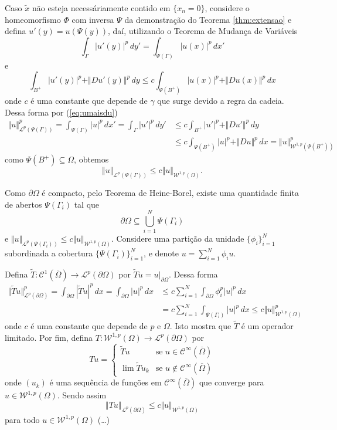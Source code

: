 \documentclass[a4paper, 11pt]{book}
\theoremstyle{definition}
\newcommand{\cC}{\mathcal{C}}
\newcommand{\cL}{\mathcal{L}}
\newcommand{\cW}{\mathcal{W}}
\begin{document}
\begin{prf}
    Caso $\tilde x$ não esteja necessáriamente contido em $\{x_n =0 \}$, considere o homeomorfismo $\Phi$ com inversa $\Psi$ da demonstração do Teorema \ref{thm:extensao} e defina $u'(y) = u(\Psi(y))$, daí, utilizando o Teorema de Mudança de Variáveis
    \[
        \int_\Gamma |u'(y)|^p \,dy' = \int_{\Psi(\Gamma)} |u(x)|^p \,dx'
    \]
    e
    \[
        \int_{B^+} |u'(y)|^p + \Vert Du'(y) \Vert^p \,dy \leqslant c\int_{\Psi(B^+)} |u(x)|^p + \Vert Du(x) \Vert^p \,dx
    \]
    onde $c$ é uma constante que depende de $\gamma$ que surge devido a regra da cadeia. Dessa forma por (\ref{eq:umaisdu})
    \[
        \begin{aligned}
            \Vert u \Vert^p_{\cL^p(\Psi(\Gamma))} = \int_{\Psi(\Gamma)} |u|^p \,dx' = \int_{\Gamma} |u'|^p \,dy' &\leqslant c\int_{B^+} |u'|^p + \Vert Du' \Vert^p \,dy\\ 
            &\leqslant c \int_{\Psi(B^+)} |u|^p + \Vert Du \Vert^p \,dx = \Vert u \Vert_{\cW^{1,p}(\Psi(B^+))}^p
        \end{aligned}
    \]
    como $\Psi(B^+) \subseteq \Omega$, obtemos 
    \[
        \Vert u \Vert_{\cL^p(\Psi(\Gamma))} \leqslant c \Vert u \Vert_{\cW^{1,p}(\Omega)}.
    \]

    Como $\partial\Omega$ é compacto, pelo Teorema de Heine-Borel, existe uma quantidade finita de abertos $\Psi(\Gamma_i)$ tal que
    \[
        \partial\Omega \subseteq \bigcup_{i=1}^N \Psi(\Gamma_i)
    \]
    e $\Vert u \Vert_{\cL^p(\Psi(\Gamma_i))} \leqslant c \Vert u \Vert_{\cW^{1,p}(\Omega)}$.
    Considere uma partição da unidade $\{\phi_i\}_{i=1}^N$ subordinada a cobertura $\{\Psi(\Gamma_i)\}_{i=1}^N$, e denote $u = \sum_{i=1}^N \phi_i u$.

    Defina $\widetilde T : \cC^1(\overline \Omega) \to \cL^p(\partial\Omega)$ por $\widetilde T u = u |_{\partial \Omega}$.
    Dessa forma
    \[
        \begin{aligned}
            \Vert \widetilde Tu \Vert_{\cL^p(\partial \Omega)}^p = \int_{\partial\Omega} | \widetilde T u|^p \,dx = \int_{\partial\Omega} |u|^p \,dx &\leqslant c \sum_{i=1}^{N} \int_{\partial \Omega} \phi_i^p |u|^p \,dx\\ 
            &= c \sum_{i=1}^N \int_{\Psi(\Gamma_i)} |u|^p \,dx \leqslant c\Vert u \Vert_{\cW^{1,p}(\Omega)}^p
        \end{aligned}
    \]
    onde $c$ é uma constante que depende de $p$ e $\Omega$. Isto mostra que $\widetilde T$ é um operador limitado.
    Por fim, defina $T : \cW^{1,p}(\Omega) \to \cL^p(\partial \Omega)$ por
    \[
        T u = \left\{  
            \begin{array}{ll}
                \widetilde Tu &\text{se } u \in \cC^{\infty}(\overline\Omega)\\
                \lim \widetilde Tu_k &\text{se } u \not \in \cC^{\infty}(\overline\Omega)
            \end{array}
        \right.
    \]
    onde $(u_k)$ é uma sequência de funções em $\cC^{\infty}(\overline\Omega)$ que converge para $u \in \cW^{1,p}(\Omega)$. Sendo assim
    \[
        \Vert Tu \Vert_{\cL^p(\partial\Omega)} \leqslant c \Vert u \Vert_{\cW^{1,p}(\Omega)}
    \]
    para todo $u \in \cW^{1,p}(\Omega)$ (\dots)
\end{prf}
\end{document}
